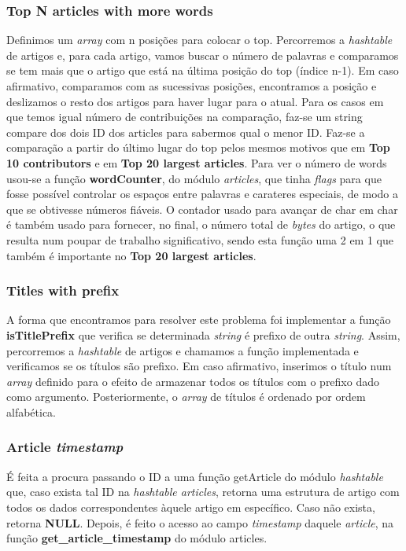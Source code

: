 \documentclass[a4paper]{article}
\begin{document}
\subsubsection{Top N articles with more words}
Definimos um \textit{array} com n posições para colocar o top. Percorremos a \textit{hashtable} de artigos e, para cada artigo, vamos buscar o número de palavras e comparamos se tem mais que o artigo que está na última posição do top (índice n-1). Em caso afirmativo, comparamos com as sucessivas posições, encontramos a posição e deslizamos o resto dos artigos para haver lugar para o atual. Para os casos em que temos igual número de contribuições na comparação, faz-se um string compare dos dois ID dos articles para sabermos qual o menor ID.
Faz-se a comparação a partir do último lugar do top pelos mesmos motivos que em \textbf{Top 10 contributors} e em \textbf{Top 20 largest articles}.
Para ver o número de words usou-se a função \textbf{wordCounter}, do módulo \textit{articles}, que tinha \textit{flags} para que fosse possível controlar os espaços entre palavras e carateres especiais, de modo a que se obtivesse números fiáveis. O contador usado para avançar de char em char é também usado para fornecer, no final, o número total de \textit{bytes} do artigo, o que resulta num poupar de trabalho significativo, sendo esta função uma 2 em 1 que também é importante no \textbf{Top 20 largest articles}.

\subsubsection{Titles with prefix}
A forma que encontramos para resolver este problema foi implementar a função \textbf{isTitlePrefix} que verifica se determinada \textit{string} é prefixo de outra \textit{string}. Assim, percorremos a \textit{hashtable} de artigos e chamamos a função implementada e verificamos se os títulos são prefixo. Em caso afirmativo, inserimos o título num \textit{array} definido para o efeito de armazenar todos os títulos com o prefixo dado como argumento. Posteriormente, o \textit{array} de títulos é ordenado por ordem alfabética.

\subsubsection{Article \textit{timestamp}}
É feita a procura passando o ID a uma função getArticle do módulo \textit{hashtable} que, caso exista tal ID na \textit{hashtable articles}, retorna uma estrutura de artigo com todos os dados correspondentes àquele artigo em específico. Caso não exista, retorna \textbf{NULL}. Depois, é feito o acesso ao campo \textit{timestamp} daquele \textit{article}, na função \textbf{get\_article\_timestamp} do módulo articles.
\end{document}
